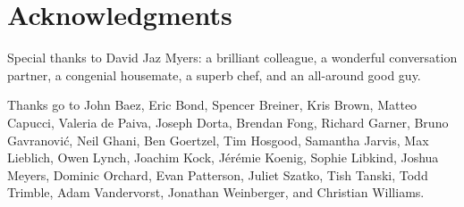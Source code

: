 \documentclass[Book-Poly]{subfiles}
\begin{document}
\section*{Acknowledgments}

Special thanks to David Jaz Myers: a brilliant colleague, a wonderful conversation partner, a congenial housemate, a superb chef, and an all-around good guy. 

Thanks go to John Baez, Eric Bond, Spencer Breiner, Kris Brown, Matteo Capucci, Valeria de Paiva, Joseph Dorta, Brendan Fong, Richard Garner, Bruno Gavranovi\'c, Neil Ghani, Ben Goertzel, Tim Hosgood, Samantha Jarvis, Max Lieblich, Owen Lynch, Joachim Kock, J\'er\'emie Koenig, Sophie Libkind, Joshua Meyers, Dominic Orchard, Evan Patterson, Juliet Szatko, Tish Tanski, Todd Trimble, Adam Vandervorst, Jonathan Weinberger, and Christian Williams.
\end{document}
